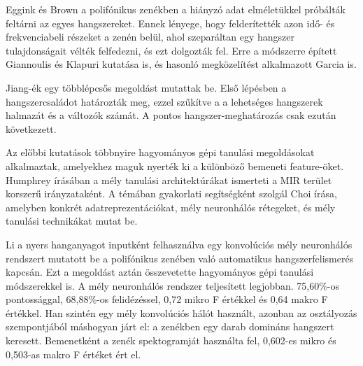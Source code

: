 Eggink és Brown \cite{egginkandbrown2003} a polifónikus zenékben a hiányzó adat elméletükkel próbálták feltárni az egyes hangszereket. Ennek lényege, hogy felderítették azon idő- és frekvenciabeli részeket a zenén belül, ahol szeparáltan egy hangszer tulajdonságait vélték felfedezni, és ezt dolgozták fel. Erre a módszerre épített Giannoulis és Klapuri \cite{giannoulisandklapuri2013} kutatása is, és hasonló megközelítést alkalmazott Garcia \cite{garcia2011} is.
 
Jiang-ék \cite{Jiang2013} egy többlépcsős megoldást mutattak be. Első lépésben a hangszercsaládot határozták meg, ezzel szűkítve a a lehetséges hangszerek halmazát és a változók számát. A pontos hangszer-meghatározás csak ezután következett.

Az előbbi kutatások többnyire hagyományos gépi tanulási megoldásokat alkalmaztak, amelyekhez maguk nyerték ki a különböző bemeneti feature-öket. Humphrey \cite{humphrey2012} írásában a mély tanulási architektúrákat ismerteti a MIR terület korszerű irányzataként. A témában gyakorlati segítségként szolgál Choi \cite{Choi2017} írása, amelyben konkrét adatreprezentációkat, mély neuronhálós rétegeket, és mély tanulási technikákat mutat be.

Li \cite{li2015automatic} a nyers hanganyagot inputként felhasználva egy konvolúciós mély neuronhálós rendszert mutatott be a polifónikus zenében való automatikus hangszerfelismerés kapcsán. Ezt a megoldást aztán összevetette hagyományos gépi tanulási módszerekkel is. A mély neuronhálós rendszer teljesített legjobban. 75,60\%-os pontossággal, 68,88\%-os felidézéssel, 0,72 mikro F értékkel és 0,64 makro F értékkel. Han \cite{han2016deep} szintén egy mély konvolúciós hálót használt, azonban az osztályozás szempontjából máshogyan járt el: a zenékben egy darab domináns hangszert keresett. Bemenetként a zenék spektogramját használta fel, 0,602-es mikro és 0,503-as makro F értéket ért el.